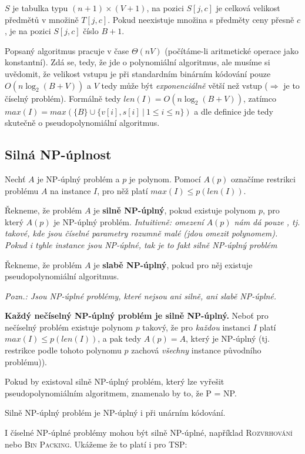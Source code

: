 \documentclass[11pt]{report} %
\numberwithin{equation}{section}
\begin{document}
$S$ je tabulka typu $(n+1)\times(V +1)$, na pozici $S[j, c]$ je celková velikost předmětů
v množině $T[j, c]$. Pokud neexistuje množina s předměty ceny přesně $c$, je na pozici
$S[j, c]$ číslo $B + 1$.

Popsaný algoritmus pracuje v čase $\Theta(nV)$ (počítáme-li aritmetické operace jako konstantní). Zdá se, tedy, že jde o polynomiální algoritmus, ale musíme si uvědomit, že velikost vstupu je při standardním binárním kódování pouze $O(n \log_2(B + V ))$ a $V$ tedy může být \textit{exponenciálně} větší než vstup ($\Rightarrow$ je to číselný problém). Formálně tedy $len(I) = O(n\log_2(B+V))$, zatímco $max(I) = max(\{B\} \cup \{v[i], s[i]\ |\ 1 \leq i \leq n \})$ a dle definice jde tedy skutečně o pseudopolynomiální algoritmus.


\subsection{Silná NP-úplnost}
Nechť $A$ je NP-úplný problém a $p$ je polynom. Pomocí $A(p)$ označíme restrikci problému $A$ na instance $I$, pro něž
platí $max(I) \leq p(len(I))$.

Řekneme, že problém $A$ je \textbf{silně NP-úplný}, pokud existuje polynom $p$, pro který $A(p)$ je NP-úplný problém.
\textit{Intuitivně: omezení $A(p)$ nám dá pouze , tj. takové, kde jsou číselné parametry rozumně malé (jdou omezit polynomem). Pokud i tyhle  instance jsou NP-úplné, tak je to fakt silně NP-úplný problém}

Řekneme, že problém $A$ je \textbf{slabě NP-úplný}, pokud pro něj existuje pseudopolynomiální algoritmus.

\textit{Pozn.: Jsou NP-úplné problémy, které nejsou ani silně, ani slabě NP-úplné.}

\textbf{Každý nečíselný NP-úplný problém je silně NP-úplný.} Neboť pro nečíselný problém existuje polynom $p$ takový, že pro \textit{každou} instanci $I$ platí $max(I) \leq p(len(I))$, a pak tedy $A(p) = A$, který je NP-úplný (tj. restrikce podle tohoto polynomu $p$ zachová \textit{všechny} instance původního problému)).

Pokud by existoval silně NP-úplný problém, který lze vyřešit pseudopolynomiálním algoritmem, znamenalo by
to, že P = NP.

Silně NP-úplný problém je NP-úplný i při unárním kódování.

I číselné NP-úplné problémy mohou být silně NP-úplné, například \textsc{Rozvrhování} nebo \textsc{Bin Packing}. Ukážeme že to platí i pro \textsc{TSP}:
\end{document}
